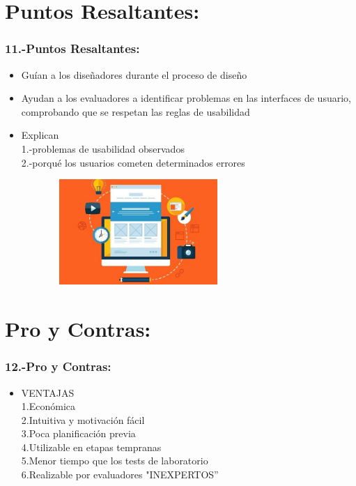 \documentclass[11pt]{beamer}
\begin{document}
\section{Puntos Resaltantes:}
\begin{frame}
\frametitle{11.-Puntos Resaltantes:}

\begin{itemize}
\item Guían a los diseñadores durante el proceso de diseño
\item Ayudan a los evaluadores a identificar problemas en las interfaces de usuario, comprobando que se respetan las reglas de usabilidad
\item Explican\\ 1.-problemas de usabilidad observados\\ 2.-porqué los usuarios cometen determinados errores

\end{itemize}

\begin{figure}
  \centering
  \includegraphics[width=8.0cm,height=4.0cm]{img/image_6.jpg}
\end{figure}
\end{frame}

\section{Pro y Contras:}
\begin{frame}
\frametitle{12.-Pro y Contras:}

\begin{itemize}
\item VENTAJAS\\ 1.Económica\\ 2.Intuitiva y motivación fácil\\ 3.Poca planificación previa \\4.Utilizable en etapas tempranas  \\5.Menor tiempo que los tests de laboratorio  \\6.Realizable por evaluadores "INEXPERTOS”

\end{itemize}
\end{frame}
\end{document}
